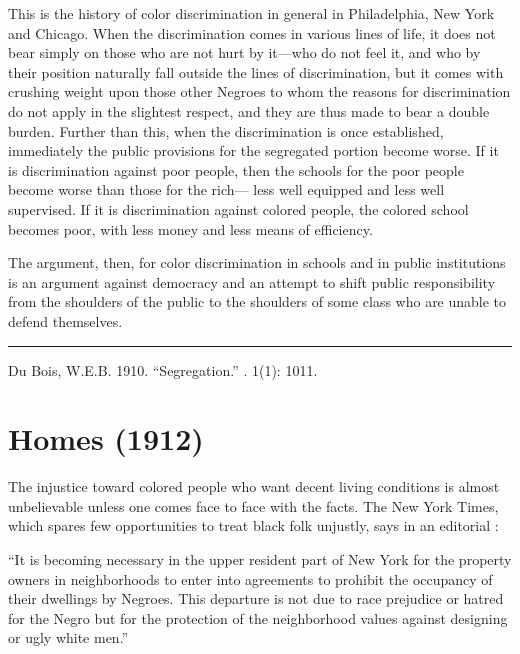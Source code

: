 \documentclass[letterpaper,10pt,english]{jupyterBook}
\begin{document}
\sphinxAtStartPar
This is the history of color discrimination in general in Philadelphia, New York and Chicago. When the discrimination comes in various lines of life, it does not bear simply on those who are not hurt by it—who do not feel it, and who by their position naturally fall outside the lines of discrimination, but it comes with crushing weight upon those other Negroes to whom the reasons for discrimination do not apply in the slightest respect, and they are thus made to bear a double burden. Further than this, when the discrimination is once established, immediately the public provisions for the segregated portion become worse. If it is discrimination against poor people, then the schools for the poor people become worse than those for the rich— less well equipped and less well supervised. If it is discrimination against colored people, the colored school becomes poor, with less money and less means of efficiency.

\sphinxAtStartPar
The argument, then, for color discrimination in schools and in public institutions is an argument against democracy and an attempt to shift public responsibility from the shoulders of the public to the shoulders of some class who are unable to defend themselves.


\bigskip\hrule\bigskip


\sphinxAtStartPar
{} Du Bois, W.E.B. 1910. “Segregation.” . 1(1): 10\sphinxhyphen{}11.


\section{Homes (1912)}
\label{\detokenize{Volumes/03/05/homes:homes-1912}}\label{\detokenize{Volumes/03/05/homes::doc}}
\sphinxAtStartPar
The injustice toward colored people who want decent living conditions is almost unbelievable unless one comes face to face with the facts. The New York Times, which spares few opportunities to treat black folk unjustly, says in an editorial :

\sphinxAtStartPar
“It is becoming necessary in the upper resident part of New York for the property owners in neighborhoods to enter into agreements to prohibit the occupancy of their dwellings by Negroes. This departure is not due to race prejudice or hatred for the Negro but for the protection of the neighborhood values against designing or ugly white men.”
\end{document}
